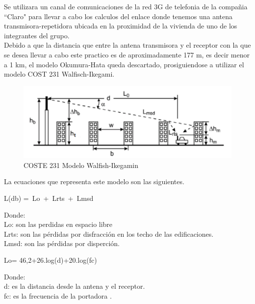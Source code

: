 \documentclass[conference, 9pt, a4paper]{IEEEtran}
\begin{document}
Se utilizara un canal de comunicaciones de la red 3G de telefonia de la compañia ``Claro" para llevar a cabo los calculos del enlace donde tenemos una antena transmisora-repetidora ubicada en la proximidad de la vivienda de uno de los integrantes del grupo.\\
Debido a que la distancia que entre la antena transmisora
y el receptor con la que se desea llevar a cabo este practico es de aproximadamente 177 m, es decir menor a 1 km, el modelo Okumura-Hata queda descartado, prosiguiendose a utilizar el modelo  COST 231 Walfisch-Ikegami.\\



\begin{figure}
	\centering
	\includegraphics[width=\columnwidth]{image/GRAFICAAA.PNG}
	\caption{ COSTE 231 Modelo Walfish-Ikegamin}
\end{figure}




La ecuaciones que representa este modelo son las siguientes.\\
\begin{center}
 L(db) =\ Lo\ +\ Lrts\ +\ Lmsd 
\end{center}
Donde:\\
Lo: son las perdidas en espacio libre\\
Lrts: son las pérdidas por disfracción en los techo de las edificaciones. \\
Lmsd: son las pérdidas por disperción.\\
\begin{center}
 Lo= 46,2+26.log(d)+20.log(fc)
\end{center}
Donde:\\
d: es la distancia desde la antena y el receptor.\\
fc: es la frecuencia de la portadora . \\
\end{document}
